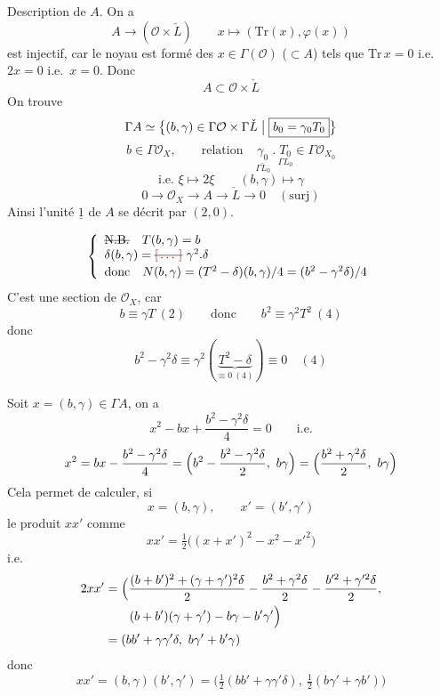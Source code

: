 \documentclass[11pt,a4paper]{article}
\begin{document}
Description de $A$. On a
\[
  A \longrightarrow (\mathcal{O} \times \check{L}) \qquad x \longmapsto (\mathrm{Tr}(x), \varphi(x))
\]
est injectif, car le noyau est formé des $x \in \Gamma(\mathcal{O})$ ($\subset A$) tels que $\mathrm{Tr}\,x = 0$ i.e.\ $2x = 0$ i.e.\ $x = 0$. Donc
\[
  A \subset \mathcal{O} \times \check{L}
\]
On trouve
\[
  \Gamma A \simeq \bigl\{ (b, \gamma) \in \Gamma \mathcal{O} \times \Gamma \check{L} \bigm| \boxed{b_{0} = \gamma_{0} T_{0}} \bigr\}
\]
\[
  b \in \Gamma \mathcal{O}_{X}, \qquad \text{relation}\quad
  \underset{\Gamma \check{L}_{0}}{\gamma_{0}} \,.\, \underset{\Gamma L_{0}}{T_{0}} \in \Gamma \mathcal{O}_{X_{0}}
\]
\[
  \text{i.e.\ } \xi \mapsto 2\xi \qquad (b, \gamma) \longmapsto \gamma
\]
\[
  0 \to \mathcal{O}_{X} \longrightarrow A \longrightarrow \check{L} \to 0 \quad (\text{surj})
\]
Ainsi l'unité $\underline{1}$ de $A$ se décrit par $(2, 0)$.

\[
  \left\{\begin{array}{l}
    \text{\struck{N.B.}}\quad T(b, \gamma) = b\\
    \delta(b, \gamma) = \text{\struck{\ill{}}}\ \gamma^{2}.\delta\\[2pt]
    \text{donc}\quad N(b, \gamma) = (T^{2} - \delta)(b, \gamma)/4 = (b^{2} - \gamma^{2}\delta)/4
  \end{array}\right.
\]
C'est une section  de $\mathcal{O}_{X}$, car
\[
  b \equiv \gamma T \ (2) \qquad\text{donc}\qquad b^{2} \equiv \gamma^{2}T^{2} \ (4)
\]
donc
\[
  b^{2} - \gamma^{2}\delta \equiv \gamma^{2}(\underbrace{T^{2} - \delta}_{\equiv 0\ (4)}) \equiv 0 \quad (4)
\]

Soit $x = (b, \gamma) \in \Gamma A$, on a
\[
  x^{2} - bx + \frac{b^{2} - \gamma^{2}\delta}{4} = 0 \qquad\text{i.e.}
\]
\[
  x^{2} = bx - \frac{b^{2} - \gamma^{2}\delta}{4}
  = \Bigl( b^{2} - \frac{b^{2} - \gamma^{2}\delta}{2},\ b\gamma \Bigr)
  = \Bigl( \frac{b^{2} + \gamma^{2}\delta}{2},\ b\gamma \Bigr)
\]
Cela permet de calculer, si
\[
  x = (b, \gamma), \qquad x' = (b', \gamma')
\]
le produit $xx'$ comme
\[
  xx' = \tfrac{1}{2}\bigl( (x + x')^{2} - x^{2} - x'^{2} \bigr)
\]
i.e.
\begin{align*}
  2xx' &= \Bigl( \frac{(b + b')^{2} + (\gamma + \gamma')^{2}\delta}{2}
          - \frac{b^{2} + \gamma^{2}\delta}{2} - \frac{b'^{2} + \gamma'^{2}\delta}{2},\\
       &\qquad (b + b')(\gamma + \gamma') - b\gamma - b'\gamma' \Bigr)\\
       &= (bb' + \gamma\gamma'\delta,\ b\gamma' + b'\gamma)
\end{align*}
donc
\[
  \boxed{xx' = (b, \gamma)(b', \gamma') = \bigl( \tfrac{1}{2}(bb' + \gamma\gamma'\delta),\ \tfrac{1}{2}(b\gamma' + \gamma b') \bigr)}
\]
\end{document}
